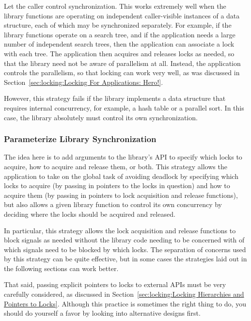 Let the caller control synchronization.
This works extremely well when the library functions are operating
on independent caller-visible instances of a data structure, each
of which may be synchronized separately.
For example, if the library functions operate on a search tree,
and if the application needs a large number of independent search
trees, then the application can associate a lock with each tree.
The application then acquires and releases locks as needed, so
that the library need not be aware of parallelism at all.
Instead, the application controls the parallelism, so that locking
can work very well, as was discussed in
Section~\ref{sec:locking:Locking For Applications: Hero!}.

However, this strategy fails if the
library implements a data structure that requires internal
concurrency, for example, a hash table or a parallel sort.
In this case, the library absolutely must control its own
synchronization.

\subsubsection{Parameterize Library Synchronization}
\label{sec:locking:Parameterize Library Synchronization}

The idea here is to add arguments to the library's API to specify
which locks to acquire, how to acquire and release them, or both.
This strategy allows the application to take on the global task of
avoiding deadlock by specifying which locks to acquire (by passing in
pointers to the locks in question) and how to
acquire them (by passing in pointers to lock acquisition and release
functions),
but also allows a given library function to control its own concurrency
by deciding where the locks should be acquired and released.

In particular, this strategy allows the lock acquisition and release
functions to block signals as needed without the library code needing to
be concerned with of which signals need to be blocked by which locks.
The separation of concerns used by this strategy can be quite effective,
but in some cases the strategies laid out in the following sections
can work better.

That said, passing explicit pointers to locks to external APIs must
be very carefully considered, as discussed in
Section~\ref{sec:locking:Locking Hierarchies and Pointers to Locks}.
Although this practice is sometimes the right thing to do, you should do
yourself a favor by looking into alternative designs first.

